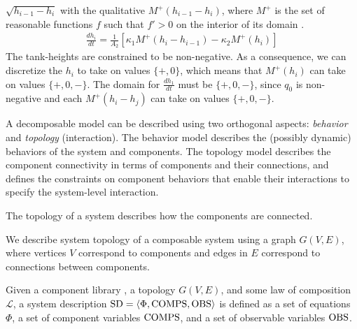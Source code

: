 $\sqrt{h_{i - 1} - h_i}$ with the qualitative $M^+(h_{i - 1} - h_i)$,
where $M^+$ is the set of reasonable functions $f$ such that $f' > 0$
on the interior of its domain
\citep{kuipers1994composition}.
%
\begin{eqnarray}
%
\frac{d h_i}{dt} = \frac{1}{A_2}\left[\kappa_{1} M^+(h_{i} - h_{i - 1}) - \kappa_2 M^+(h_i)\right]
%
\end{eqnarray}
%
The tank-heights are constrained to be non-negative. As a consequence,
we can discretize the $h_i$ to take on values $\{+, 0\}$, which means
that $M^+(h_i)$ can take on values $\{+, 0, -\}$.  The domain for
$\frac{d h_1}{dt}$ must be $\{+, 0, -\}$, since $q_0$ is non-negative
and each $M^+(h_i - h_j)$ can take on values $\{+, 0, -\}$.
\par
A decomposable model can be described using two orthogonal aspects:
\textit{behavior} and \textit{topology} (interaction). The behavior
model describes the (possibly dynamic) behaviors of the system and
components. The topology model describes the component connectivity in
terms of components and their connections, and defines the constraints
on component behaviors that enable their interactions to specify the
system-level interaction.
\par
The topology of a system describes how the components are connected.
%
\begin{definition}[Topology]
%
We describe system topology of a composable system using a graph $G(V,
E)$, where vertices $V$ correspond to components and edges in $E$
correspond to connections between components.
%
\end{definition}
%
\begin{definition}
%
Given a component library \cl, a topology $G(V, E)$, and some law of
composition $\mathcal{L}$, a system description $\mathrm{SD} = \langle\Phi,
\mathrm{COMPS}, \mathrm{OBS}\rangle$ is defined as a set of
equations $\Phi$, a set of component variables $\mathrm{COMPS}$, and a set of
observable variables $\mathrm{OBS}$.
%
\end{definition}
%
%
%
%
%

